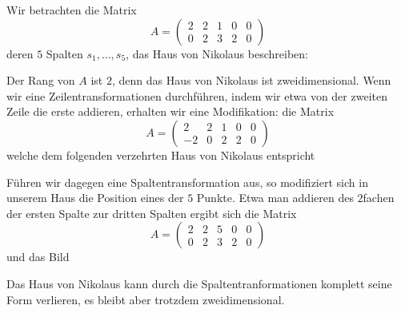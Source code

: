\begin{bsp}
	Wir betrachten die Matrix
	\[
		 A= \begin{pmatrix} 
		 		2 & 2 & 1 & 0 & 0 \\ 
		 		0 & 2 & 3 & 2 & 0 
		 \end{pmatrix} 
	\]
	deren $5$ Spalten $s_1, \ldots, s_5$, das Haus von Nikolaus beschreiben: 
	\begin{center} 
	\end{center} 
	Der Rang von $A$ ist $2$, denn das Haus von Nikolaus ist zweidimensional. Wenn wir eine Zeilentransformationen durchführen, indem wir etwa von der zweiten Zeile die erste addieren, erhalten wir eine Modifikation: die Matrix 
	\[
		 A= \begin{pmatrix} 
			2 & 2 & 1 & 0 & 0 \\ 
		-2 & 0 & 2 & 2 & 0 
		\end{pmatrix} 
	\]
	welche dem folgenden verzehrten Haus von Nikolaus entspricht
	\begin{center} 
\end{center}  
	Führen wir dagegen eine Spaltentransformation aus, so modifiziert sich in unserem Haus die Position eines der $5$ Punkte. Etwa man addieren des $2$fachen der ersten Spalte zur dritten Spalten ergibt sich die Matrix 
	\[
A= \begin{pmatrix} 
	2 & 2 & 5 & 0 & 0 \\ 
	0 & 2 & 3 & 2 & 0 
\end{pmatrix} 
\]
und das Bild 
	\begin{center} 
\end{center} 
	Das Haus von Nikolaus kann durch die Spaltentranformationen komplett seine Form verlieren, es bleibt aber trotzdem zweidimensional. 
\end{bsp} 

